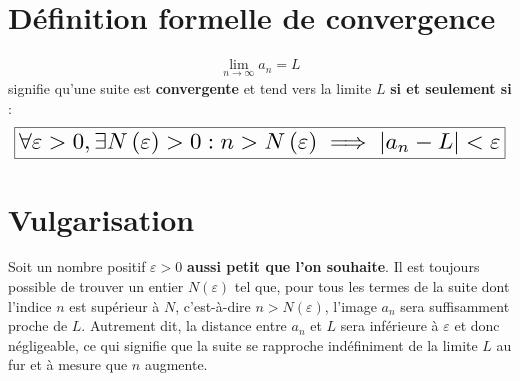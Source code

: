 \documentclass{report}
\begin{document}
\begin{multicols*}{3}
\begin{center}
\end{center}
    

    \section{Définition formelle de convergence}
    \vspace{-1em}
    \begin{align*}
        \lim\limits_{n\to \infty}a_n = L 
    \end{align*}
    signifie qu'une suite est \textcolor{myb}{\textbf{convergente }} et tend vers la limite $L$ 
    \textbf{si et seulement si} :
    \vspace{1em}
    \[%
        \boxed{\resizebox{1\linewidth}{!}{$
        \forall\varepsilon > 0, \exists N\left( \varepsilon \right) > 0 : 
        n > N\left( \varepsilon \right) \implies |a_n -L| < \varepsilon
    $}}
    \]%

    \section{Vulgarisation}
    Soit un nombre positif $\varepsilon > 0$ \textbf{aussi petit que l'on souhaite}. 
    Il est toujours possible de trouver un entier 
    $N(\varepsilon)$ tel que, pour tous les termes de la suite dont l'indice $n$ est supérieur à 
    $N$, c'est-à-dire $n > N(\varepsilon)$, l'image $a_n$ sera suffisamment proche de $L$. 
    Autrement dit, la distance entre $a_n$ et $L$ sera inférieure à $\varepsilon$ et donc négligeable, 
    ce qui signifie que la suite se rapproche indéfiniment de la limite $L$ au fur et à mesure que $n$ augmente.
    \vspace{-2em}


    \begin{center}
        \begin{tikzpicture}[scale=.85]



\end{tikzpicture}
\end{center}
\end{multicols*}
\end{document}
